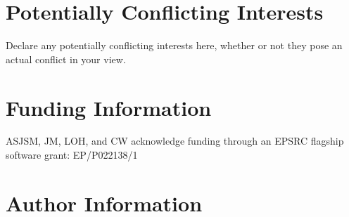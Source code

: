 \documentclass[9pt,tutorial]{livecoms}
\begin{document}
\section*{Potentially Conflicting Interests}

Declare any potentially conflicting interests here, whether or not they pose an actual conflict in your view.

\section*{Funding Information}
ASJSM, JM, LOH, and CW acknowledge funding through an EPSRC flagship software grant: EP/P022138/1

\section*{Author Information}
\makeorcid




\end{document}

